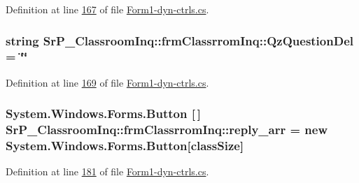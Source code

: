 \-Definition at line \hyperlink{_form1-dyn-ctrls_8cs_source_l00167}{167} of file \hyperlink{_form1-dyn-ctrls_8cs_source}{\-Form1-\/dyn-\/ctrls.\-cs}.

\hypertarget{class_sr_p___classroom_inq_1_1frm_classrrom_inq_a1fe88369748706492ccc7292a0e47331}{
\subsubsection[{\-Qz\-Question\-Del}]{\setlength{\rightskip}{0pt plus 5cm}string {\bf \-Sr\-P\-\_\-\-Classroom\-Inq\-::frm\-Classrrom\-Inq\-::\-Qz\-Question\-Del} = \char`\"{}\char`\"{}}}
\label{class_sr_p___classroom_inq_1_1frm_classrrom_inq_a1fe88369748706492ccc7292a0e47331}


\-Definition at line \hyperlink{_form1-dyn-ctrls_8cs_source_l00169}{169} of file \hyperlink{_form1-dyn-ctrls_8cs_source}{\-Form1-\/dyn-\/ctrls.\-cs}.

\hypertarget{class_sr_p___classroom_inq_1_1frm_classrrom_inq_a46ee30d934a5219840e4381a66728f0f}{
\subsubsection[{reply\-\_\-arr}]{\setlength{\rightskip}{0pt plus 5cm}\-System.\-Windows.\-Forms.\-Button \mbox{[}$\,$\mbox{]} {\bf \-Sr\-P\-\_\-\-Classroom\-Inq\-::frm\-Classrrom\-Inq\-::reply\-\_\-arr} = new \-System.\-Windows.\-Forms.\-Button\mbox{[}{\bf class\-Size}\mbox{]}}}
\label{class_sr_p___classroom_inq_1_1frm_classrrom_inq_a46ee30d934a5219840e4381a66728f0f}


\-Definition at line \hyperlink{_form1-dyn-ctrls_8cs_source_l00181}{181} of file \hyperlink{_form1-dyn-ctrls_8cs_source}{\-Form1-\/dyn-\/ctrls.\-cs}.

